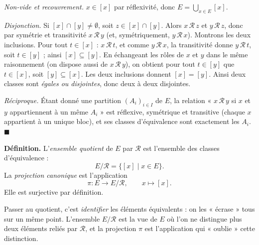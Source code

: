 \begin{mdframed}[style=proofbar]
  \textit{Non-vide et recouvrement.} $x \in [x]$ par réflexivité, donc
  $E = \bigcup_{x\in E}[x]$.

  \textit{Disjonction.} Si $[x]\cap[y]\neq\emptyset$, soit $z\in[x]\cap[y]$.
  Alors $x\,\mathcal{R}\,z$ et $y\,\mathcal{R}\,z$, donc par symétrie et transitivité
  $x\,\mathcal{R}\,y$ (et, symétriquement, $y\,\mathcal{R}\,x$). Montrons les deux
  inclusions. Pour tout $t \in [x]$ : $x\,\mathcal{R}\,t$, et comme
  $y\,\mathcal{R}\,x$, la transitivité donne $y\,\mathcal{R}\,t$, soit $t\in[y]$ ;
  ainsi $[x]\subseteq[y]$. En échangeant les rôles de $x$ et $y$ dans le même
  raisonnement (on dispose aussi de $x\,\mathcal{R}\,y$), on obtient pour tout
  $t\in[y]$ que $t\in[x]$, soit $[y]\subseteq[x]$. Les deux inclusions donnent
  $[x]=[y]$. Ainsi deux classes sont \emph{égales ou disjointes}, donc deux à
  deux disjointes.

  \textit{Réciproque.} Étant donné une partition $(A_i)_{i\in I}$ de $E$, la
  relation « $x\,\mathcal{R}\,y$ si $x$ et $y$ appartiennent à un même $A_i$ »
  est réflexive, symétrique et transitive (chaque $x$ appartient à un unique
  bloc), et ses classes d'équivalence sont exactement les $A_i$. \hfill$\blacksquare$
\end{mdframed}

\decsep{}


\begin{tcolorbox}[thmbox]
  \textbf{Définition.}\enspace%
  L'\emph{ensemble quotient} de $E$ par $\mathcal{R}$ est l'ensemble des
  classes d'équivalence :
  \[
    E/\mathcal{R} = \bigl\{[x] \mid x \in E\bigr\}.
  \]
  La \emph{projection canonique} est l'application
  \[
    \pi : E \longrightarrow E/\mathcal{R}, \qquad x \longmapsto [x].
  \]
  Elle est surjective par définition.
\end{tcolorbox}

\begin{significationintuitive}
  Passer au quotient, c'est \emph{identifier} les éléments équivalents : on les
  « écrase » tous sur un même point. L'ensemble $E/\mathcal{R}$ est la vue de $E$
  où l'on ne distingue plus deux éléments reliés par $\mathcal{R}$, et la
  projection $\pi$ est l'application qui « oublie » cette distinction.
\end{significationintuitive}

